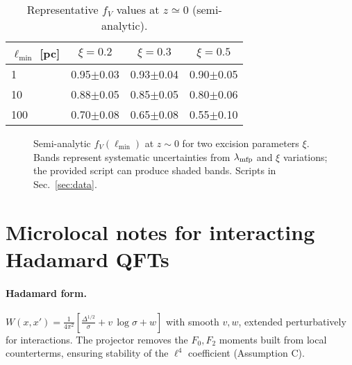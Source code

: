 \documentclass[aps,prd,onecolumn,superscriptaddress,nofootinbib]{revtex4-2}
\begin{document}
\begin{table}[b]
\centering
\caption{Representative \(f_V\) values at \(z\simeq 0\) (semi-analytic).}
\label{tab:fV}
\begin{tabular}{lccc}
\toprule
\(\ell_{\min}\) [pc] & \(\xi=0.2\) & \(\xi=0.3\) & \(\xi=0.5\) \\
\midrule
1   & 0.95\(\pm\)0.03 & 0.93\(\pm\)0.04 & 0.90\(\pm\)0.05 \\
10  & 0.88\(\pm\)0.05 & 0.85\(\pm\)0.05 & 0.80\(\pm\)0.06 \\
100 & 0.70\(\pm\)0.08 & 0.65\(\pm\)0.08 & 0.55\(\pm\)0.10 \\
\bottomrule
\end{tabular}
\end{table}

\begin{figure}[t]
\centering
{}
\caption{Semi-analytic \(f_V(\ell_{\min})\) at \(z\!\sim\!0\) for two excision parameters \(\xi\). Bands represent systematic uncertainties from \(\lambda_{\rm mfp}\) and \(\xi\) variations; the provided script can produce shaded bands. Scripts in Sec.~\ref{sec:data}.}
\label{fig:fV}
\end{figure}

\section{Microlocal notes for interacting Hadamard QFTs}
\label{app:microlocal}
\paragraph{Hadamard form.}
\(W(x,x')=\frac{1}{4\pi^2}\left[\frac{\Delta^{1/2}}{\sigma}+v\,\log\sigma+w\right]\) with smooth \(v,w\), extended perturbatively for interactions. The projector removes the \(F_0,F_2\) moments built from local counterterms, ensuring stability of the \(\ell^4\) coefficient (Assumption C).
\end{document}
